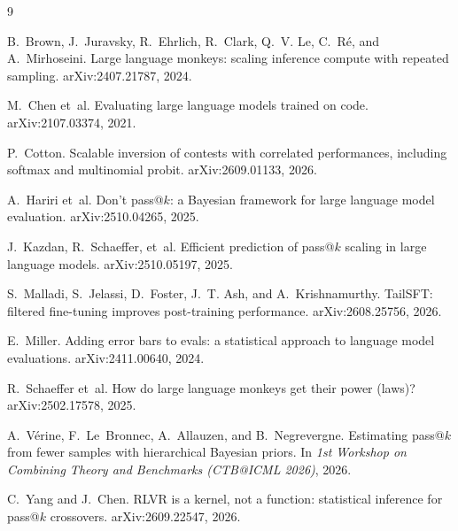 \documentclass[11pt]{article}
\theoremstyle{itheads}
\begin{document}
\begin{thebibliography}{9}

 B.~Brown, J.~Juravsky,
R.~Ehrlich, R.~Clark, Q.~V. Le, C.~R\'e, and A.~Mirhoseini. Large
language monkeys: scaling inference compute with repeated sampling.
arXiv:2407.21787, 2024.

 M.~Chen et~al. Evaluating
large language models trained on code. arXiv:2107.03374, 2021.

 P.~Cotton. Scalable inversion of
contests with correlated performances, including softmax and
multinomial probit. arXiv:2609.01133, 2026.

 A.~Hariri et~al. Don't
pass@$k$: a Bayesian framework for large language model evaluation.
arXiv:2510.04265, 2025.

 J.~Kazdan, R.~Schaeffer,
et~al. Efficient prediction of pass@$k$ scaling in large language
models. arXiv:2510.05197, 2025.

 S.~Malladi, S.~Jelassi, D.~Foster,
J.~T. Ash, and A.~Krishnamurthy. TailSFT: filtered fine-tuning
improves post-training performance. arXiv:2608.25756, 2026.

 E.~Miller. Adding error bars to
evals: a statistical approach to language model evaluations.
arXiv:2411.00640, 2024.

 R.~Schaeffer et~al.
How do large language monkeys get their power (laws)?
arXiv:2502.17578, 2025.

 A.~V\'erine, F.~Le~Bronnec,
A.~Allauzen, and B.~Negrevergne. Estimating pass@$k$ from fewer
samples with hierarchical Bayesian priors. In \emph{1st Workshop on
Combining Theory and Benchmarks (CTB@ICML 2026)}, 2026.

 C.~Yang and J.~Chen. RLVR
is a kernel, not a function: statistical inference for pass@$k$
crossovers. arXiv:2609.22547, 2026.

\end{thebibliography}
\end{document}
